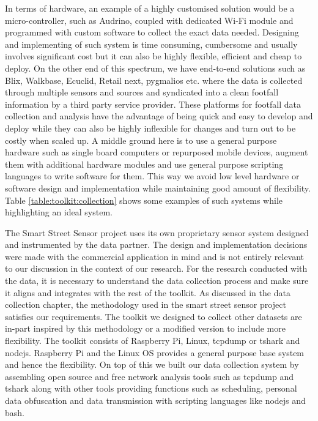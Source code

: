 In terms of hardware, an example of a highly customised solution would be a micro-controller, such as Audrino, coupled with dedicated Wi-Fi module and programmed with custom software to collect the exact data needed.
Designing and implementing of such system is time consuming, cumbersome and usually involves significant cost but it can also be highly flexible, efficient and cheap to deploy.
On the other end of this spectrum, we have end-to-end solutions such as Blix, Walkbase, Ecuclid, Retail next, pygmalios etc. where the data is collected through multiple sensors and sources and syndicated into a clean footfall information by a third party service provider.
These platforms for footfall data collection and analysis have the advantage of being quick and easy to develop and deploy while they can also be highly inflexible for changes and turn out to be costly when scaled up.
A middle ground here is to use a general purpose hardware such as single board computers or repurposed mobile devices, augment them with additional hardware modules and use general purpose scripting languages to write software for them.
This way we avoid low level hardware or software design and implementation while maintaining good amount of flexibility.
Table \ref{table:toolkit:collection} shows some examples of such systems while highlighting an ideal system.

The Smart Street Sensor project uses its own proprietary sensor system designed and instrumented by the data partner.
The design and implementation decisions were made with the commercial application in mind and is not entirely relevant to our discussion in the context of our research.
For the research conducted with the data, it is necessary to understand the data collection process and make sure it aligns and integrates with the rest of the toolkit.
As discussed in the data collection chapter, the methodology used in the smart street sensor project satisfies our requirements.
The toolkit we designed to collect other datasets are in-part inspired by this methodology or a modified version to include more flexibility.
The toolkit consists of Raspberry Pi, Linux, tcpdump or tshark \cite{wireshark2} and nodejs.
Raspberry Pi and the Linux OS provides a general purpose base system and hence the flexibility.
On top of this we built our data collection system by assembling open source and free network analysis tools such as tcpdump and tshark along with other tools providing functions such as scheduling, personal data obfuscation and data transmission with scripting languages like nodejs and bash.

